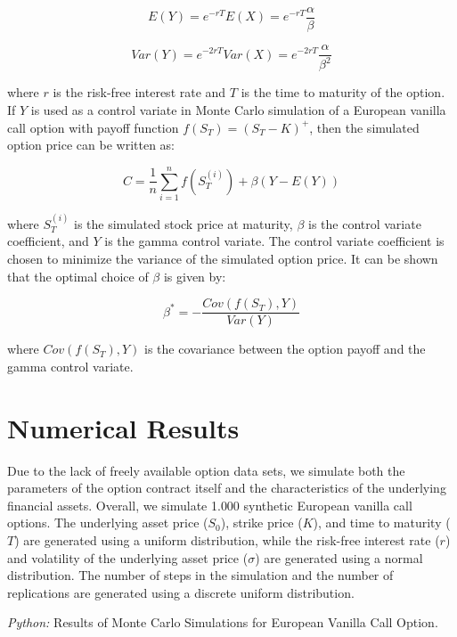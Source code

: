 \documentclass[11pt, a4paper, leqno]{article}
\begin{document}
\begin{equation}
E(Y) = e^{-rT}E(X) = e^{-rT}\frac{\alpha}{\beta}
\end{equation}

\begin{equation}
Var(Y) = e^{-2rT}Var(X) = e^{-2rT}\frac{\alpha}{\beta^2}
\end{equation}

where $r$ is the risk-free interest rate and $T$ is the time to maturity of the option. If $Y$ is used as a control variate in Monte Carlo simulation of a European vanilla call option with payoff function $f(S_T) = (S_T - K)^+$, then the simulated option price can be written as:

\begin{equation}
C = \frac{1}{n} \sum_{i=1}^{n} f(S_T^{(i)}) + \beta(Y - E(Y))
\end{equation}

where $S_T^{(i)}$ is the simulated stock price at maturity, $\beta$ is the control variate coefficient, and $Y$ is the gamma control variate. The control variate coefficient is chosen to minimize the variance of the simulated option price. It can be shown that the optimal choice of $\beta$ is given by:

\begin{equation}
\beta^* = -\frac{Cov(f(S_T), Y)}{Var(Y)}
\end{equation}

where $Cov(f(S_T), Y)$ is the covariance between the option payoff and the gamma control variate.
\section{Numerical Results}\label{sec:results}

Due to the lack of freely available option data sets, we simulate both the parameters of the option contract itself and the characteristics of the underlying financial assets. Overall, we simulate 1.000 synthetic European vanilla call options. The underlying asset price ($S_0$), strike price ($K$), and time to maturity ($T$) are generated using a uniform distribution, while the risk-free interest rate ($r$) and volatility of the underlying asset price ($\sigma$) are generated using a normal distribution. The number of steps in the simulation and the number of replications are generated using a discrete uniform distribution.

\begin{center}
    \begin{table}[hbt!]
        
        \caption{\label{tab:results}\emph{Python:} Results of Monte Carlo Simulations for European Vanilla Call Option.}
    \end{table}
    \end{center}
\end{document}
